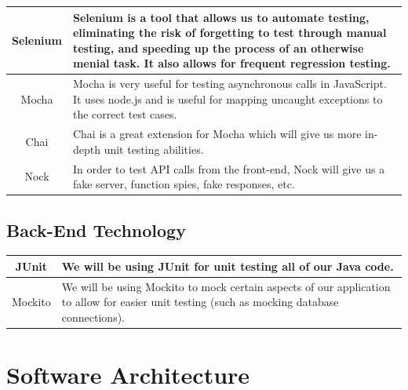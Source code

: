 \documentclass[11pt, titlepage]{article}
\begin{document}
\begin{center}
        \begin{table}[!htbp]
        \centering
        \begin{tabularx}{\linewidth}{|| c | L ||}
    \hline
    Selenium & Selenium is a tool that allows us to automate testing, eliminating the risk of forgetting to test through manual testing, and speeding up the process of an otherwise menial task. It also allows for frequent regression testing.  \\
    \hline
    Mocha & Mocha is very useful for testing asynchronous calls in JavaScript. It uses node.js and is useful for mapping uncaught exceptions to the correct test cases. \\
    \hline
    Chai & Chai is a great extension for Mocha which will give us more in-depth unit testing abilities.\\
    \hline
    Nock & In order to test API calls from the front-end, Nock will give us a fake server, function spies, fake responses, etc.\\
    \hline
    \end{tabularx}
    \end{table}
\end{center}

\clearpage

\subsection{Back-End Technology}

\begin{center}
        \begin{table}[!htbp]
        \centering
        \begin{tabularx}{\linewidth}{|| c | L ||}
    \hline
    JUnit & We will be using JUnit for unit testing all of our Java code. \\
    \hline
    Mockito & We will be using Mockito to mock certain aspects of our application to allow for easier unit testing (such as mocking database connections). \\
    \hline
    \end{tabularx}
    \end{table}
\end{center}

\section{Software Architecture}
\end{document}
